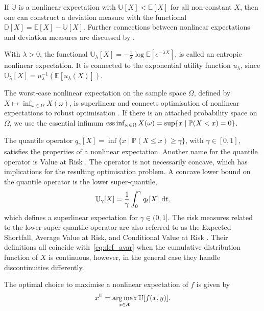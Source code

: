 \documentclass[main.tex]{subfiles}
\begin{document}
If $\mathbb{U}$ is a nonlinear expectation
with $\mathbb{U}[X] < \mathbb{E}[X]$ for all non-constant $X$,
then one can
construct a deviation measure with the functional
$\mathbb{D}[X]=\mathbb{E}[X]-\mathbb{U}[X]$.
Further connections between nonlinear expectations and deviation
measures are discussed by \citet{rockafellar2013fundamental}.

\begin{example}
  With $\lambda>0$, the functional
  $\mathbb{U}_\lambda[X]=-\frac{1}{\lambda}\log\mathbb{E}[e^{-\lambda
    X}]$, is called an entropic nonlinear expectation.
  It is connected to the exponential utility function $u_\lambda$, since
  $\mathbb{U}_\lambda[X]= u_\lambda^{-1}(\mathbb{E}[u_\lambda(X)])$.

  The worst-case nonlinear expectation on the sample space $\Omega$,
  defined by
  $X\mapsto  \inf_{\omega\in\Omega}X(\omega)$, is superlinear and
  connects optimisation of nonlinear expectations to robust optimisation \citep{ben2009robust}.
  If there is an attached
  probability space on $\Omega$,
  we use the essential infimum
  $\operatorname*{ess\,inf}_{\omega\in\Omega} X(\omega) = \sup\{x \mid \mathbb{P}(X<x)=0\}$.

  The quantile operator
  $q_\gamma[X] = \inf\{x\mid\mathbb{P}(X\leq x)\geq
  \gamma\}$, with $\gamma\in[0,1]$, satisfies the properties of a
  nonlinear expectation.
  Another name for the quantile operator is Value at Risk \citep{follmer2004stochastic}.
  The operator is not necessarily concave, which has
  implications for the resulting optimisation problem.
  A concave lower bound on the quantile operator is
  the lower super-quantile,
  \begin{equation}\label{eq:def_avar}
    \mathbb{U}_\gamma[X]=\frac{1}{\gamma}\int_0^\gamma q_t[X]\,\,\mathrm{d}t,
  \end{equation}
  which defines a superlinear expectation for $\gamma\in(0,1]$.
  The risk measures related to the lower super-quantile operator are also referred to as
  the Expected Shortfall, Average Value at Risk, and Conditional Value at Risk
  \citep{artzner1999coherent,rockafellar2002conditional,follmer2004stochastic,rockafellar2013fundamental}.
  Their definitions all coincide with~\eqref{eq:def_avar} when the
  cumulative distribution function of $X$ is continuous, however, in
  the general case they handle discontinuities differently.
\end{example}


\begin{problem}
  The optimal choice to maximise a nonlinear expectation
  of $f$ is given by
  \begin{align}
    x^{\mathbb{U}}=\operatorname*{arg\,max}_{x\in\mathcal{X}} \mathbb{U}[f(x,y)].
  \end{align}
\end{problem}
\end{document}

